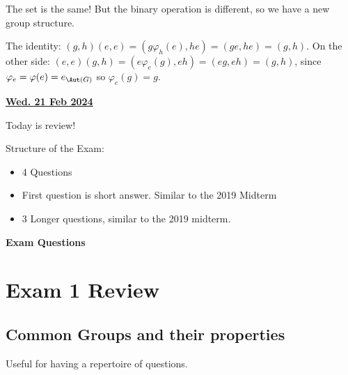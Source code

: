 \documentclass[12pt]{article}
\renewcommand{\date}[1]{\underline{\bf #1}}
\begin{document}
The set is the same! But the binary operation is different, so we have a new
group structure.

The identity: $(g, h)(e, e) = (g \varphi_h(e), he) = (ge, he) = (g, h)$.
On the other side: $(e, e)(g, h) = (e \varphi_e(g), eh) = (eg, eh) = (g, h)$,
since $\varphi_e = \varphi(e) = e_{\Aut(G)}$ so $\varphi_e(g) = g$.



\newpage
\date{Wed. 21 Feb 2024}

Today is review!

Structure of the Exam:
\begin{itemize}
  \item 4 Questions
  \item First question is short answer. Similar to the 2019 Midterm
  \item 3 Longer questions, similar to the 2019 midterm.
\end{itemize}

{\bf Exam Questions}

\section{Exam 1 Review}

\subsection{Common Groups and their properties}

Useful for having a repertoire of questions.
\end{document}
